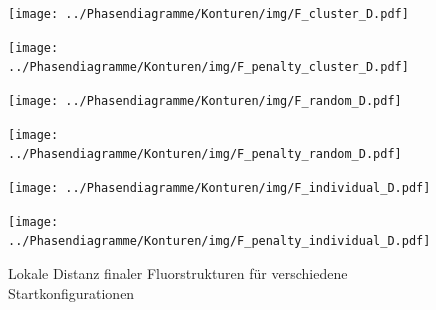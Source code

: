 \documentclass[a4paper, 10pt, twoside, openany]{book} %
\begin{document}
	\begin{figure}
		\begin{minipage}[t]{0.48\textwidth}
			\texttt{[image: ../Phasendiagramme/Konturen/img/F\_cluster\_D.pdf]}
			\label{F_cluster_D}
		\end{minipage}
		\hfill
		\begin{minipage}[t]{0.48\textwidth}
			\texttt{[image: ../Phasendiagramme/Konturen/img/F\_penalty\_cluster\_D.pdf]}
			\label{F_penalty_cluster_D}
		\end{minipage}
		\begin{minipage}[t]{0.48\textwidth}
			\texttt{[image: ../Phasendiagramme/Konturen/img/F\_random\_D.pdf]}
			\label{F_random_D}
		\end{minipage}
		\hfill
		\begin{minipage}[t]{0.48\textwidth}
			\texttt{[image: ../Phasendiagramme/Konturen/img/F\_penalty\_random\_D.pdf]}
			\label{F_penalty_random_D}
		\end{minipage}
		\begin{minipage}[t]{0.48\textwidth}
			\texttt{[image: ../Phasendiagramme/Konturen/img/F\_individual\_D.pdf]}
			\label{F_individual_D}
		\end{minipage}
		\hfill
		\begin{minipage}[t]{0.48\textwidth}
			\texttt{[image: ../Phasendiagramme/Konturen/img/F\_penalty\_individual\_D.pdf]}
			\label{F_penalty_individual_D}
		\end{minipage}
		\caption[Lokale Distanz finaler Fluorstrukturen]{Lokale Distanz finaler Fluorstrukturen für verschiedene Startkonfigurationen}
		\label{F_D}
	\end{figure}
	
\end{document}
